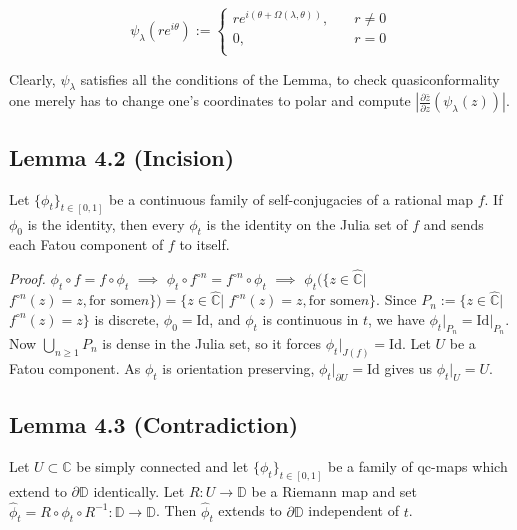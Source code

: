 \documentclass[11pt,a4paper]{article}
\begin{document}
        $$\psi_{\lambda}(re^{i\theta}) :=
        \begin{cases}
        re^{i(\theta+\Omega(\lambda, \theta))}, &\quad r\neq0\\
        0, &\quad r =0\\
        \end{cases}$$


        Clearly, $\psi_{\lambda}$ satisfies all the conditions of the Lemma, to check quasiconformality one merely has to change one's coordinates to polar and compute $\left|\frac{\partial \bar{z}}{\partial z}(\psi_{\lambda}(z))\right|$.



        \subsection*{Lemma 4.2 (Incision)} Let $\{\phi_t\}_{t\in[0,1]}$ be a continuous family of self-conjugacies of a rational map $f$. If $\phi_0$ is the identity, then every $\phi_t$ is the identity on the Julia set of $f$ and sends each Fatou component of $f$ to itself.


        \textit{Proof.} $\phi_t\circ f = f\circ \phi_t$ $\implies$ $\phi_t\circ f^{\circ n} = f^{\circ n}\circ \phi_t$ $\implies$ $\phi_t(\{z\in \hat{\mathbb{C}}|$ $f^{\circ n}(z) = z, \text{for some}  n\}) = \{z\in \hat{\mathbb{C}}|$ $f^{\circ n}(z)=z, \text{for some}  n\}$. Since $P_n:= \{z\in \hat{\mathbb{C}}|$ $f^{\circ n}(z)=z\}$ is discrete, $\phi_0 = \text{Id}$, and $\phi_t$ is continuous in $t$, we have $\phi_t\big|_{P_n} = \text{Id}\big|_{P_n}$. Now $\bigcup_{n\geq1}P_n$ is dense in the Julia set, so it forces $\phi_t\big|_{J(f)} = \text{Id}$.  Let $U$ be a Fatou component. As $\phi_t$ is orientation preserving, $\phi_t\big|_{\partial U} = \text{Id}$ gives us $\phi_t\big|_{U} = U$.



        \subsection*{Lemma 4.3 (Contradiction)} Let $U\subset \mathbb{C}$ be simply connected and let $\{\phi_t\}_{t\in[0,1]}$ be a family of qc-maps which extend to $\partial \mathbb{D}$ identically. Let $R:U\rightarrow \mathbb{D}$ be a Riemann map and set $\hat{\phi}_t = R\circ \phi_t\circ R^{-1}:\mathbb{D} \rightarrow \mathbb{D}$. Then $\hat{\phi}_t$ extends to $\partial \mathbb{D}$ independent of $t$.
\end{document}
